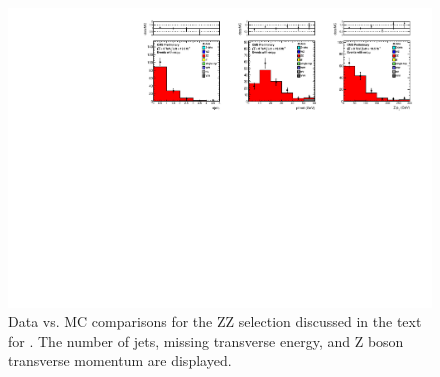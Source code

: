 \begin{figure}[tbh]
\begin{center}
\includegraphics[width=1\linewidth]{plots/ZZ_19p5fb.pdf}
\caption{\label{fig:zz}\protect 
Data vs. MC comparisons for the ZZ selection discussed in the text for \lumi.
The number of jets, missing transverse energy, and Z boson transverse momentum are displayed.
}
\end{center}
\end{figure}

